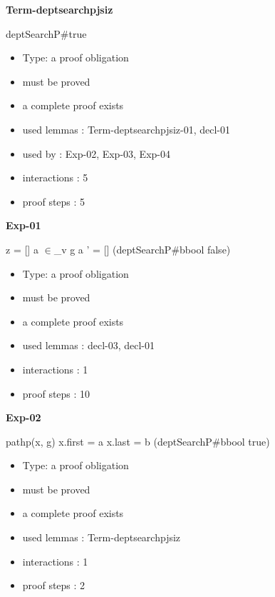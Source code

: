 {\medskip

{\LARGE\bf Term-deptsearchpjsiz}

\medskip

 \Fol \Do deptSearchP\#\Dc true

\begin{itemize}

\item Type: a proof obligation

\item       must be proved
\item       a complete proof exists
\item       used lemmas  : Term-deptsearchpjsiz-01, decl-01
\item       used by      : Exp-02, Exp-03, Exp-04
\item       interactions : 5
\item       proof steps  : 5
\end{itemize}

\medskip

{\LARGE\bf Exp-01}

\medskip

 \Fol z = [] \And a $\in$\_v g \Or a ' = [] \Imp (\Do deptSearchP\#\Dc bbool \Equiv false)

\begin{itemize}

\item Type: a proof obligation

\item       must be proved
\item       a complete proof exists
\item       used lemmas  : decl-03, decl-01
\item       interactions : 1
\item       proof steps  : 10
\end{itemize}

\medskip

{\LARGE\bf Exp-02}

\medskip

 \Fol pathp(x, g) \And x.first = a \And x.last = b \Imp (\Do deptSearchP\#\Dc bbool \Equiv true)

\begin{itemize}

\item Type: a proof obligation

\item       must be proved
\item       a complete proof exists
\item       used lemmas  : Term-deptsearchpjsiz
\item       interactions : 1
\item       proof steps  : 2
\end{itemize}

}

